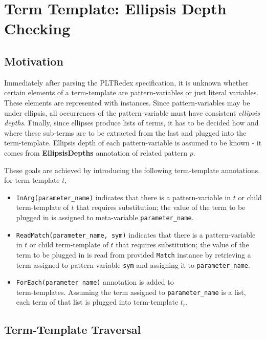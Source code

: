 \section{Term Template: Ellipsis Depth Checking}

\subsection{Motivation}

Immediately after parsing the PLTRedex specification, it is unknown whether certain elements of a term-template are pattern-variables or just literal variables. These elements are represented with \UnresolvedSymbol \space instances. Since pattern-variables may be under ellipsis, all occurrences of the pattern-variable must have consistent \textit{ellipsis depths}. Finally, since ellipses produce lists of terms, it has to be decided how and where these sub-terms are to be extracted from the last and plugged into the term-template. Ellipsis depth of each pattern-variable is assumed to be known - it comes from \textbf{EllipsisDepths} annotation of related pattern $p$.

These goals are achieved by introducing the following term-template annotations. for term-template $t$,

\begin{itemize}
\item
\texttt{InArg(parameter\_name)} indicates that there is a pattern-variable in $t$ or child term-template of $t$ that requires substitution; the value of the term to be plugged in is assigned to meta-variable \texttt{parameter\_name}.
\item
\texttt{ReadMatch(parameter\_name, sym)} indicates that there is a pattern-variable in $t$ or child term-template of $t$ that requires substitution; the value of the term to be plugged in is read from provided \texttt{Match} instance by retrieving a term assigned to pattern-variable \texttt{sym} and assigning it to \texttt{parameter\_name}.
\item
\texttt{ForEach(parameter\_name)} annotation is added to \TermRepeat \\ term-templates. Assuming the term assigned to \texttt{parameter\_name} is a list, each term of that list is plugged into term-template $t_r$.
\end{itemize}

\subsection{Term-Template Traversal}


